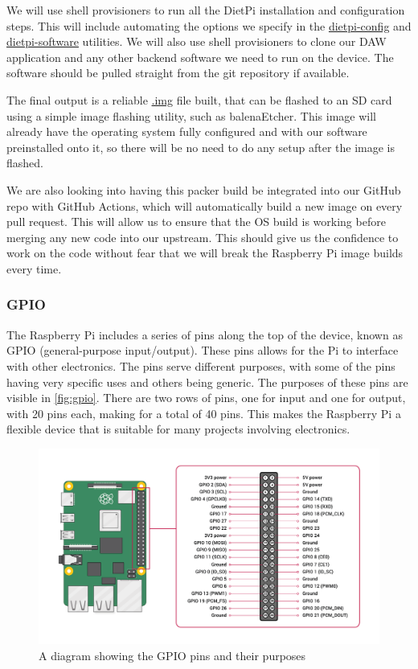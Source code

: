 We will use shell provisioners to run all the DietPi installation and configuration steps.
This will include automating the options we specify in the \url{dietpi-config} and
\url{dietpi-software} utilities. We will also use shell provisioners to clone our DAW
application and any other backend software we need to run on the device. The software
should be pulled straight from the git repository if available.

The final output is a reliable \url{.img} file built, that can be flashed to an SD card
using a simple image flashing utility, such as balenaEtcher. This image will already have
the operating system fully configured and with our software preinstalled onto it, so there
will be no need to do any setup after the image is flashed.

We are also looking into having this packer build be integrated into our GitHub repo with
GitHub Actions, which will automatically build a new image on every pull request. This
will allow us to ensure that the OS build is working before merging any new code into our
upstream. This should give us the confidence to work on the code without fear that we will
break the Raspberry Pi image builds every time.

\subsubsection{GPIO}

The Raspberry Pi includes a series of pins along the top of the device, known as GPIO
(general-purpose input/output). These pins allows for the Pi to interface with other
electronics. The pins serve different purposes, with some of the pins having very specific
uses and others being generic. The purposes of these pins are visible in
\autoref{fig:gpio}. There are two rows of pins, one for input and one for output, with 20
pins each, making for a total of 40 pins. This makes the Raspberry Pi a flexible device
that is suitable for many projects involving electronics.

\begin{figure}
  \centerline{ \includegraphics[width=\linewidth]{image/gpio.png} }
  \caption{A diagram showing the GPIO pins and their purposes \autocite{gpio}}
  \label{fig:gpio}
\end{figure}


